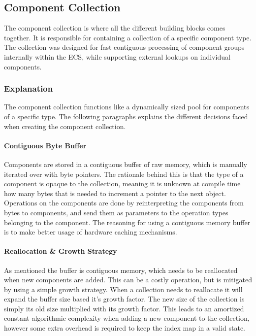 \subsection{Component Collection}
\label{subsec:detailed_component_collection}
The component collection is where all the different building blocks
comes together.
It is responsible for containing
a collection of a specific component type.
The collection was designed for fast contiguous processing of component groups internally within the ECS,
while supporting external lookups on individual components.

\subsubsection{Explanation}
The component collection functions like a dynamically sized pool for components of a specific type.
The following paragraphs explains the different decisions faced when creating the component collection.

\paragraph{Contiguous Byte Buffer}
Components are stored in a contiguous buffer of raw memory,
which is manually iterated over with byte pointers.
The rationale behind this is that the type of a component is opaque
to the collection, meaning it is unknown at compile time
how many bytes that is needed to increment a pointer to the next object.
Operations on the components are done by reinterpreting the components from bytes to components,
and send them as parameters to the operation types belonging to the component.
The reasoning for using a contiguous memory buffer is to make better usage of hardware caching mechanisms.

\paragraph{Reallocation \& Growth Strategy}
As mentioned the buffer is contiguous memory, which needs to be reallocated when new components are added.
This can be a costly operation, but is mitigated by using a simple growth strategy.
When a collection needs to reallocate it will expand the buffer size based it's growth factor.
The new size of the collection is simply its old size multiplied with its growth factor.
This leads to an amortized constant algorithmic complexity when adding a new component to the collection,
however some extra overhead is required to keep the index map in a valid state.

